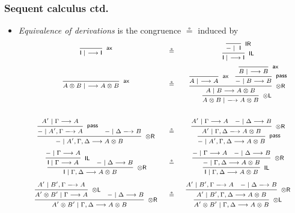 \documentclass[10pt,t]{beamer}
\newcommand{\I}{\mathsf{I}}
\newcommand{\ot}{\otimes}
\newcommand{\n}{{-}}
\newcommand{\ax}{\mathsf{ax}}
\newcommand{\uf}{\mathsf{pass}}
\newcommand{\IL}{\I\mathsf{L}}
\newcommand{\otL}{\ot\mathsf{L}}
\newcommand{\IR}{\I\mathsf{R}}
\newcommand{\otR}{\ot\mathsf{R}}
\renewcommand{\vdash}{\longrightarrow}
\newcommand{\proofbox}[1]{\begin{tabular}{l} #1 \end{tabular}}
\begin{document}
\begin{frame}

\frametitle{Sequent calculus ctd.}

\begin{itemize}

\item \emph{Equivalence of derivations} is the congruence $\circeq$
  induced by
\[
\scriptsize
\begin{array}{c@{\quad \circeq\quad}c}
\proofbox{
\infer[\ax]{\I \mid ~ \vdash \I}{
}
}
&
\proofbox{
\infer[\IL]{\I \mid ~ \vdash \I}{
  \infer[\IR]{\n \mid ~ \I}{
  }
}
}
\\[12pt]
\proofbox{
\infer[\ax]{A \ot B \mid ~ \vdash A \ot B}{
}
}
&
\proofbox{
\infer[\otL]{A \ot B \mid ~ \vdash A \ot B}{
  \infer[\otR]{A \mid B \vdash A \ot B}{
   \infer[\ax]{A \mid ~ \vdash A}{
   }
   &
   \infer[\uf]{\n \mid B \vdash B}{
     \infer[\ax]{B \mid ~ \vdash B}{
     }
   }
 }
} 
}
\\[36pt]
\proofbox{
\infer[\otR]{\n \mid A', \Gamma, \Delta \vdash A \otimes B}{
  \infer[\uf]{\n \mid A', \Gamma \vdash A}{
    A' \mid \Gamma \vdash A
  }
  &
  \n \mid \Delta \vdash B
}
}
&
\proofbox{
\infer[\uf]{\n \mid A', \Gamma, \Delta \vdash A \otimes B}{
  \infer[\otR]{A' \mid \Gamma, \Delta \vdash A \otimes B}{
    A' \mid \Gamma \vdash A
    &
    \n \mid \Delta \vdash B
  }
}
}
\\[18pt]
\proofbox{
\infer[\otR]{\I \mid \Gamma, \Delta \vdash A \otimes B}{
  \infer[\IL]{\I \mid \Gamma \vdash A}{
    \n \mid \Gamma \vdash A
  }
  &
  \n \mid \Delta \vdash B
}
}
&
\proofbox{
\infer[\IL]{\I \mid \Gamma, \Delta \vdash A \otimes B}{
  \infer[\otR]{\n \mid \Gamma, \Delta \vdash A \otimes B}{
    \n \mid \Gamma \vdash A
    &
    \n \mid \Delta \vdash B
  }
}
}
\\[18pt]
\proofbox{
\infer[\otR]{A' \ot B' \mid \Gamma, \Delta \vdash A \otimes B}{
  \infer[\otL]{A' \ot B' \mid \Gamma \vdash A}{
    A' \mid B', \Gamma \vdash A
  }
  &
  \n \mid \Delta \vdash B
}
}
&
\proofbox{
\infer[\otL]{A' \ot B' \mid \Gamma, \Delta \vdash A \otimes B}{
  \infer[\otR]{A' \mid B', \Gamma, \Delta \vdash A \otimes B}{
    A' \mid B', \Gamma \vdash A
    &
    \n \mid \Delta \vdash B
  }
}
}
\end{array}
\]

\end{itemize}

\end{frame}

\end{document}
